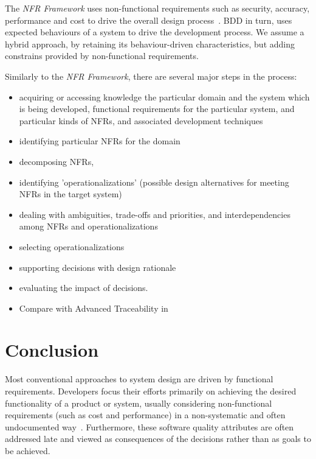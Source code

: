 \documentclass[dissertation,final]{softeng}
\begin{document}
The \emph{NFR Framework} uses non-functional requirements such as security, accuracy, performance and cost to drive the overall design process~\citep{Chung2000}. BDD in turn, uses expected behaviours of a system to drive the development process. We assume a hybrid approach, by retaining its behaviour-driven characteristics, but adding constrains provided by non-functional requirements.

Similarly to the \emph{NFR Framework}, there are several major steps in the process:
\begin{itemize}
\item acquiring or accessing knowledge the particular domain and the system which is being developed, functional requirements for the particular system, and particular kinds of NFRs, and associated development techniques
\item identifying particular NFRs for the domain
\item decomposing NFRs,
\item identifying 'operationalizations' (possible design alternatives for meeting
NFRs in the target system)
\item dealing with ambiguities, trade-offs and priorities, and interdependencies among NFRs and operationalizations
\item selecting operationalizations
\item supporting decisions with design rationale
\item evaluating the impact of decisions.
\end{itemize}



\begin{itemize}
\item Compare with Advanced Traceability in~\citep{Hull2011}
\end{itemize}


\chapter{Conclusion}
\label{ch:Conclusion}
Most conventional approaches to system design are driven by functional requirements. Developers focus their efforts primarily on achieving the desired functionality of a product or system, usually considering non-functional requirements (such as cost and performance) in a non-systematic and often undocumented way~\citep{Chung2000}. Furthermore, these software quality attributes are often addressed late and viewed as consequences of the decisions rather than as goals to be achieved.
\end{document}
